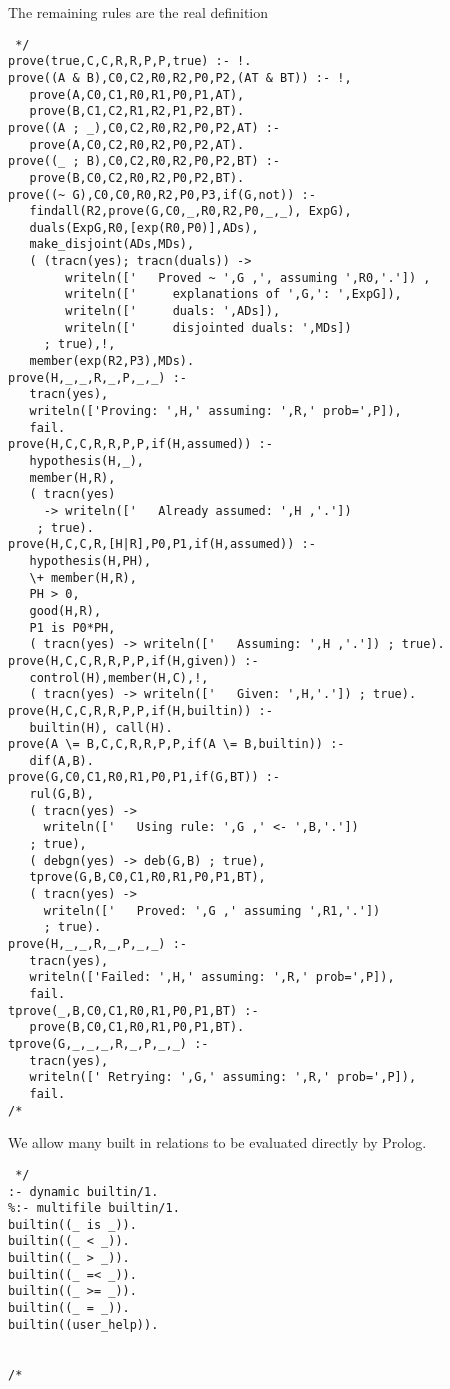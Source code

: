 \documentclass[11pt,fleqn]{article}
\begin{document}
The remaining rules are the real definition
\begin{verbatim} */
prove(true,C,C,R,R,P,P,true) :- !.
prove((A & B),C0,C2,R0,R2,P0,P2,(AT & BT)) :- !,
   prove(A,C0,C1,R0,R1,P0,P1,AT),
   prove(B,C1,C2,R1,R2,P1,P2,BT).
prove((A ; _),C0,C2,R0,R2,P0,P2,AT) :-
   prove(A,C0,C2,R0,R2,P0,P2,AT).
prove((_ ; B),C0,C2,R0,R2,P0,P2,BT) :-
   prove(B,C0,C2,R0,R2,P0,P2,BT).
prove((~ G),C0,C0,R0,R2,P0,P3,if(G,not)) :-
   findall(R2,prove(G,C0,_,R0,R2,P0,_,_), ExpG),
   duals(ExpG,R0,[exp(R0,P0)],ADs),
   make_disjoint(ADs,MDs),
   ( (tracn(yes); tracn(duals)) -> 
        writeln(['   Proved ~ ',G ,', assuming ',R0,'.']) ,
        writeln(['     explanations of ',G,': ',ExpG]),
        writeln(['     duals: ',ADs]),
        writeln(['     disjointed duals: ',MDs])
     ; true),!,
   member(exp(R2,P3),MDs).
prove(H,_,_,R,_,P,_,_) :-
   tracn(yes),
   writeln(['Proving: ',H,' assuming: ',R,' prob=',P]),
   fail.
prove(H,C,C,R,R,P,P,if(H,assumed)) :-
   hypothesis(H,_),
   member(H,R),
   ( tracn(yes) 
     -> writeln(['   Already assumed: ',H ,'.']) 
    ; true).
prove(H,C,C,R,[H|R],P0,P1,if(H,assumed)) :-
   hypothesis(H,PH),
   \+ member(H,R),
   PH > 0,
   good(H,R),
   P1 is P0*PH,
   ( tracn(yes) -> writeln(['   Assuming: ',H ,'.']) ; true).
prove(H,C,C,R,R,P,P,if(H,given)) :- 
   control(H),member(H,C),!,
   ( tracn(yes) -> writeln(['   Given: ',H,'.']) ; true).
prove(H,C,C,R,R,P,P,if(H,builtin)) :- 
   builtin(H), call(H).
prove(A \= B,C,C,R,R,P,P,if(A \= B,builtin)) :- 
   dif(A,B).
prove(G,C0,C1,R0,R1,P0,P1,if(G,BT)) :-
   rul(G,B),
   ( tracn(yes) -> 
     writeln(['   Using rule: ',G ,' <- ',B,'.']) 
   ; true),
   ( debgn(yes) -> deb(G,B) ; true),
   tprove(G,B,C0,C1,R0,R1,P0,P1,BT),
   ( tracn(yes) -> 
     writeln(['   Proved: ',G ,' assuming ',R1,'.']) 
     ; true).
prove(H,_,_,R,_,P,_,_) :-
   tracn(yes),
   writeln(['Failed: ',H,' assuming: ',R,' prob=',P]), 
   fail.
tprove(_,B,C0,C1,R0,R1,P0,P1,BT) :-
   prove(B,C0,C1,R0,R1,P0,P1,BT).
tprove(G,_,_,_,R,_,P,_,_) :-
   tracn(yes),
   writeln([' Retrying: ',G,' assuming: ',R,' prob=',P]),
   fail.
/* \end{verbatim}

We allow many built in relations to be evaluated directly by Prolog.
\begin{verbatim} */
:- dynamic builtin/1.
%:- multifile builtin/1.
builtin((_ is _)).
builtin((_ < _)).
builtin((_ > _)).
builtin((_ =< _)).
builtin((_ >= _)).
builtin((_ = _)).
builtin((user_help)).


/* \end{verbatim}
\end{document}

